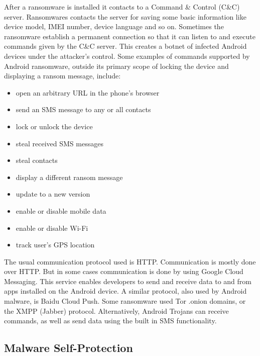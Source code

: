 After a ransomware is installed it contacts to a Command \& Control (C\&C) server.
Ransomwares contacts the server for saving some basic information like device model, IMEI number, device language and so on.
Sometimes the ransomware establish a permanent connection so that it can listen to and execute commands given by the C\&C server.
This creates a botnet of infected Android devices under the attacker’s control.
Some examples of commands supported by Android ransomware, outside its primary scope of locking the device and displaying a ransom message, include:
\begin{itemize}
\item open an arbitrary URL in the phone’s browser
\item send an SMS message to any or all contacts
\item lock or unlock the device
\item steal received SMS messages
\item steal contacts
\item display a different ransom message
\item update to a new version
\item enable or disable mobile data
\item enable or disable Wi-Fi
\item track user’s GPS location
\end{itemize}
The usual communication protocol used is HTTP.
Communication is mostly done over HTTP. 
But in some cases communication is done by using Google Cloud Messaging.
This service enables developers to send and receive data to and from apps installed on the Android device. 
A similar protocol, also used by Android malware, is Baidu Cloud Push.
Some ransomware used Tor .onion domains, or the XMPP (Jabber) protocol.
Alternatively, Android Trojans can receive commands, as well as send data using the built in SMS functionality.

\subsection{Malware Self-Protection}

